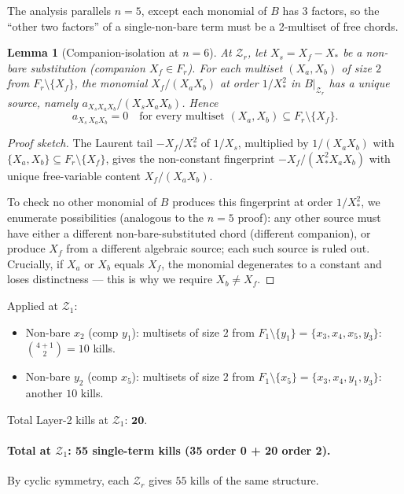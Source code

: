 \documentclass[11pt]{article}
\newcommand{\Z}{\mathcal{Z}}
\newtheorem{lemma}{Lemma}
\theoremstyle{definition}
\begin{document}
The analysis parallels $n=5$, except each monomial of $B$ has $3$ factors,
so the ``other two factors'' of a single-non-bare term must be a 2-multiset
of free chords.

\begin{lemma}[Companion-isolation at $n=6$]
\label{lem:companion-n6}
At $\Z_r$, let $X_s = X_f - X_*$ be a non-bare substitution (companion
$X_f\in F_r$). For each multiset $(X_a, X_b)$ of size $2$ from
$F_r\setminus\{X_f\}$, the monomial $X_f/(X_a X_b)$ at order $1/X_*^2$ in
$B|_{\Z_r}$ has a unique source, namely $a_{X_s X_a X_b}/(X_s X_a X_b)$.
Hence
\[
a_{X_s\,X_a X_b}=0 \quad\text{for every multiset }(X_a, X_b)\subseteq F_r\setminus\{X_f\}.
\]
\end{lemma}

\begin{proof}[Proof sketch]
The Laurent tail $-X_f/X_*^2$ of $1/X_s$, multiplied by $1/(X_a X_b)$
with $\{X_a, X_b\}\subseteq F_r\setminus\{X_f\}$, gives the non-constant
fingerprint $-X_f/(X_*^2 X_a X_b)$ with unique free-variable content
$X_f/(X_a X_b)$.

To check no other monomial of $B$ produces this fingerprint at order
$1/X_*^2$, we enumerate possibilities (analogous to the $n=5$ proof): any
other source must have either a different non-bare-substituted chord
(different companion), or produce $X_f$ from a different algebraic source;
each such source is ruled out. Crucially, if $X_a$ or $X_b$ equals $X_f$,
the monomial degenerates to a constant and loses distinctness — this is
why we require $X_b\ne X_f$.
\end{proof}

Applied at $\Z_1$:
\begin{itemize}[nosep,leftmargin=2em]
\item Non-bare $x_2$ (comp $y_1$): multisets of size $2$ from
$F_1\setminus\{y_1\}=\{x_3, x_4, x_5, y_3\}$: $\binom{4+1}{2}=10$ kills.
\item Non-bare $y_2$ (comp $x_5$): multisets of size $2$ from
$F_1\setminus\{x_5\}=\{x_3, x_4, y_1, y_3\}$: another $10$ kills.
\end{itemize}
Total Layer-2 kills at $\Z_1$: $\mathbf{20}$.

\paragraph{Total at $\Z_1$: 55 single-term kills (35 order 0 + 20 order 2).}

By cyclic symmetry, each $\Z_r$ gives $55$ kills of the same structure.
\end{document}
